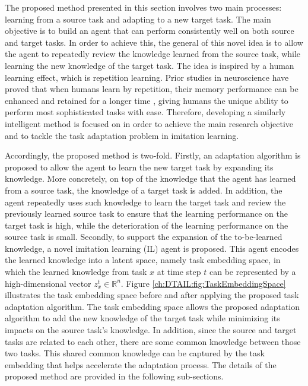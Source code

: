 The proposed method presented in this section involves two main processes:
learning from a source task and adapting to a new target task.
The main objective is to build an agent that can perform consistently well on both source and target tasks.
In order to achieve this,
the general of this novel idea
is to allow the agent to repeatedly review the knowledge learned from the source task,
while learning the new knowledge of the target task.
The idea is inspired by a human learning effect, which is repetition learning.
Prior studies in neuroscience have proved that when humans learn by repetition,
their memory performance can be enhanced and retained for a longer time \cite{Memory_Effect_1, Memory_Repetition_1, Memory_Repetition_2},
giving humans the unique ability to perform most sophisticated tasks with ease.
Therefore,
developing a similarly intelligent method is focused on in order to achieve the main research objective and to tackle the task adaptation problem in imitation learning.


Accordingly,
the proposed method is two-fold.
Firstly,
an adaptation algorithm is proposed to allow the agent to learn the new target task by expanding its knowledge.
More concretely,
on top of the knowledge that the agent has learned from a source task,
the knowledge of a target task is added.
In addition,
the agent repeatedly uses such knowledge to learn the target task and review the previously learned source task to ensure that the learning performance on the target task is high,
while the deterioration of
the learning performance on the source task is small.
Secondly,
to support the expansion of the to-be-learned knowledge,
a novel imitation learning (IL) agent is proposed.
This agent encodes the learned knowledge into a
latent space, namely task embedding space,
in which the learned knowledge from task $x$ at time step $t$ can be represented by a high-dimensional vector $z^t_x \in \mathbb{R}^n$.
Figure \ref{ch:DTAIL:fig:TaskEmbeddingSpace} illustrates the task embedding space before and after applying the proposed task adaptation algorithm.
The task embedding space allows the proposed adaptation algorithm to add the new knowledge of the target task while minimizing its impacts on the source task's knowledge.
In addition,
since the source and target tasks are related to each other,
there are some common knowledge between those two tasks.
This shared common knowledge can be captured by the task embedding that helps accelerate the adaptation process.
The details of the proposed method are provided in the following sub-sections.

